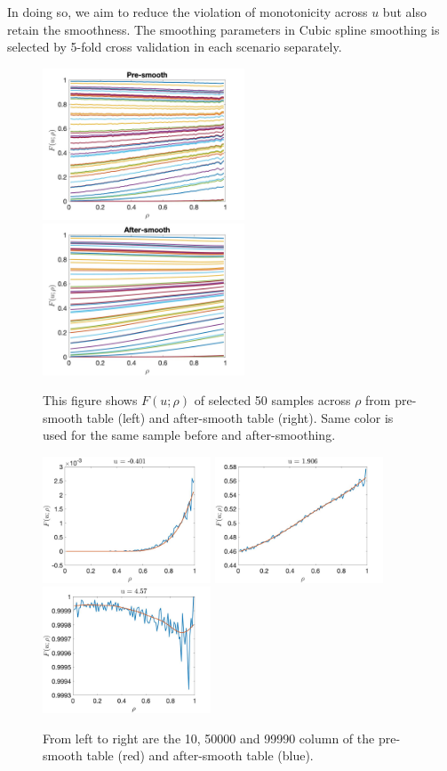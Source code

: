\documentclass{article}
\begin{document}
In doing so, we aim to reduce the violation of monotonicity across $u$ but also retain the smoothness. The smoothing parameters in Cubic spline smoothing is selected by 5-fold cross validation in each scenario separately.

\begin{figure}[!htp]
\centering
\includegraphics[width=6cm]{figure/presmooth_3D.jpg}
\includegraphics[width=6cm]{figure/Aftersmooth_3D.jpg}
\caption{This figure shows $F(u;\rho)$ of selected 50 samples across $\rho$ from pre-smooth table (left) and after-smooth table (right). Same color is used for the same sample before and after-smoothing.\label{fig4}}
\end{figure}

\begin{figure}[!htp]
\centering
\includegraphics[width=5cm]{figure/3D_cubic_10.jpg}
\includegraphics[width=5cm]{figure/3D_cubic_50000.jpg}
\includegraphics[width=5cm]{figure/3D_cubic_99990.jpg}
\caption{From left to right are the 10, 50000 and 99990 column of the pre-smooth table (red) and after-smooth table (blue). \label{fig5}}
\end{figure}
\end{document}
